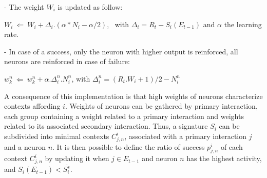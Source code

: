 \documentclass[conference]{IEEEtran}
\begin{document}
- The weight $W_i$ is updated as follow:

$W_i ~\Leftarrow~ W_i+ \Delta_i . (\alpha * N_i - \alpha /2)$, ~with $\Delta_i=R_t-S_i(E_{t-1})$
and $\alpha$ the learning rate.

- In case of a success, only the neuron with higher output is reinforced, all neurons are reinforced in case of failure:

$w_k^n ~\Leftarrow~ w_k^n+ \alpha . \Delta_i^n . N_i^n$,
with $\Delta_i^n=(R_t.W_i + 1)/2 - N_i^n$




A consequence of this implementation is that high weights of neurons characterize contexts affording $i$. %
Weights of neurons can be gathered by primary interaction, each group containing a weight related to a primary interaction and weights related to its associated secondary interaction. Thus, a signature $S_i$ can be subdivided into minimal contexts $C_{j,n}^i$, associated with a primary interaction $j$ and a neuron $n$. It is then possible to define the ratio of success $p_{j,n}^i$ %
of each context $C_{j,n}^i$ by updating it when $j \in E_{t-1}$ and neuron $n$ has the highest activity, and $S_i(E_{t-1})<\overline{S_i^s}$.%
\end{document}
